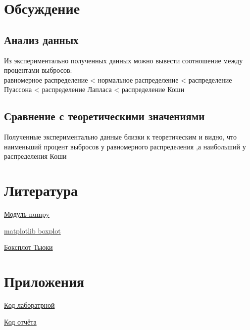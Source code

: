 \documentclass[a4]{article}
\begin{document}
	\newpage
	\section{Обсуждение}
		\subsection{Анализ данных}
		Из экспериментально полученных данных можно вывести соотношение между процентами выбросов:\\
		равномерное распределение < нормальное распределение < распределение Пуассона < распределение Лапласа < распределение Коши
		\subsection{Сравнение с теоретическими значениями}
		Полученные экспериментально данные близки к теоретическим и видно, что наименьший процент выбросов у равномерного распределения ,а наибольший у распределения Коши
	
	\section{Литература}
	
	\href{https://physics.susu.ru/vorontsov/language/numpy.html}{Модуль numpy}
	
	\href{https://matplotlib.org/3.1.1/api/_as_gen/matplotlib.pyplot.boxplot.html}{matplotlib boxplot}
	
	\href{https://habr.com/ru/post/267123/}{Боксплот Тьюки}
	
	\section{Приложения}
	
	\href{https://github.com/LuciusGen/Matstat/blob/master/Lab3/Lab3.py}{Код лаборатрной}
	
	\href{https://github.com/LuciusGen/Matstat/blob/master/Lab3/lab3.tex}{Код отчёта}
	
\end{document}
